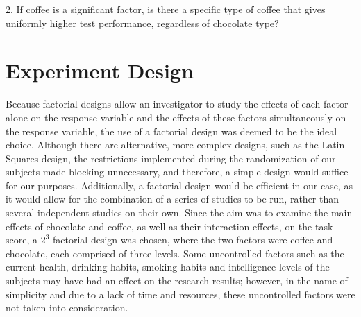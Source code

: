 \documentclass[12pt]{article}
\begin{document}
\begin{flushleft}
2. If coffee is a significant factor, is there a specific type of coffee that gives uniformly higher test performance, regardless of chocolate type?
\bigskip
\section{Experiment Design}
Because factorial designs allow an investigator to study the effects of each factor alone on the response variable and the effects of these factors simultaneously on the response variable, the use of a factorial design was deemed to be the ideal choice. Although there are alternative, more complex designs, such as the Latin Squares design, the restrictions implemented during the randomization of our subjects made blocking unnecessary, and therefore, a simple design would suffice for our purposes. Additionally, a factorial design would be efficient in our case, as it would allow for the combination of a series of studies to be run, rather than several independent studies on their own. Since the aim was to examine the main effects of chocolate and coffee, as well as their interaction effects, on the task score, a $2^3$ factorial design was chosen, where the two factors were coffee and chocolate, each comprised of three levels. Some uncontrolled factors such as the current health, drinking habits, smoking habits and intelligence levels of the subjects may have had an effect on the research results; however, in the name of simplicity and due to a lack of time and resources, these uncontrolled factors were not taken into consideration. 
\bigskip

\end{flushleft}
\end{document}
